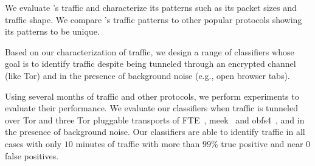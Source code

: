 \begin{compactenum}
	\item We evaluate \bc's traffic and characterize its patterns such as its packet sizes and traffic shape. We compare \bc's traffic patterns to other popular protocols showing its patterns to be unique.  
	\item Based on our characterization of \bc traffic, we design a range of classifiers whose goal is to identify \bc traffic despite being tunneled through an encrypted channel (like Tor) and in the presence of background noise (e.g., open browser tabs). 
	\item Using several months of \bc traffic and other protocols, we perform experiments to evaluate their performance. We evaluate our classifiers when \bc traffic is tunneled over Tor and three Tor pluggable transports of FTE~\cite{fte}, meek~\cite{meek} and obfs4~\cite{obfsproxy}, and in the presence of background noise. Our classifiers are able to identify \bc traffic in all cases with only $10$ minutes of traffic with more than $99\%$ true positive and near 0 false positives.
	
\end{compactenum}


\begin{comment}
 \section{Characterizing Bitcoin Traffic}
In this section, we demonstrate the unique features of \bc traffic. We show that such unique traffic patterns of \bc make it reliably distinguishable from other protocols even despite encryption and mixture with background traffic. 
We will use our characterization to design classifiers for \bc in the following sections. For the sake of space, we moved this section to the Appendix~\ref{sec:charachterzing_bc}
\end{comment}